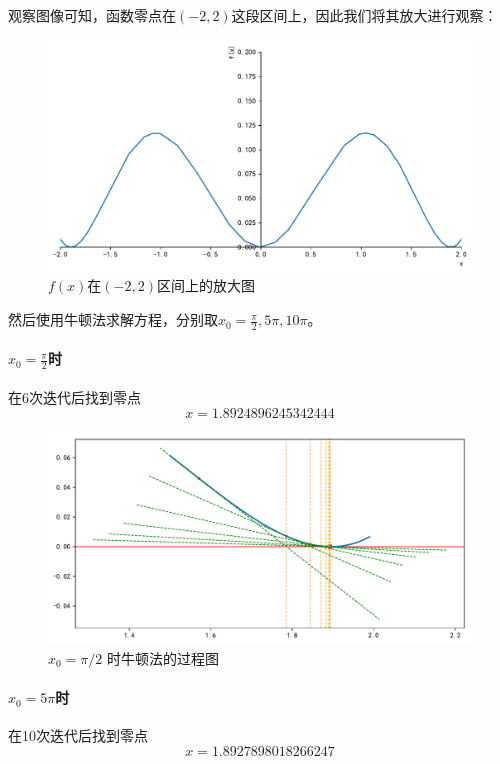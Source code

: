 观察图像可知，函数零点在$(-2, 2)$这段区间上，因此我们将其放大进行观察：

\begin{figure}[H]
	\centering
	\caption{$f(x)$在$(-2, 2)$区间上的放大图}
	\includegraphics[width=\linewidth]{fig5.pdf}
\end{figure}

然后使用牛顿法求解方程，分别取$x_0=\frac{\pi}{2},5\pi,10\pi$。

\paragraph{$x_0=\frac{\pi}{2}$时} 在6次迭代后找到零点\[x = 1.8924896245342444\]

\begin{figure}[H]
	\centering
	\caption{$x_0 = \pi / 2$ 时牛顿法的过程图}
	\includegraphics[width=\linewidth]{fig6.pdf}
\end{figure}

\paragraph{$x_0=5\pi$时} 在10次迭代后找到零点\[x = 1.8927898018266247\]


